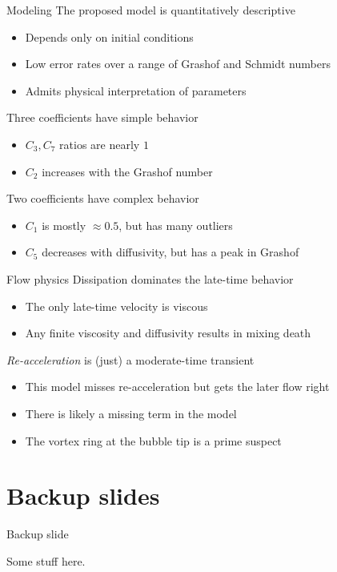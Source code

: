 \documentclass[12pt]{beamer}
\begin{document}
\begin{frame}{Modeling}
The proposed model is quantitatively descriptive
\begin{itemize}
  \item Depends only on initial conditions
  \item Low error rates over a range of Grashof and Schmidt numbers
  \item Admits physical interpretation of parameters
\end{itemize}

Three coefficients have simple behavior
\begin{itemize}
  \item $C_3, C_7$ ratios are nearly $1$
  \item $C_2$ increases with the Grashof number
\end{itemize}

Two coefficients have complex behavior
\begin{itemize}
  \item $C_1$ is mostly $\approx 0.5$, but has many outliers
  \item $C_5$ decreases with diffusivity, but has a peak in Grashof
\end{itemize}
\end{frame}

\begin{frame}{Flow physics}
Dissipation dominates the late-time behavior
\begin{itemize}
  \item The only late-time velocity is viscous
  \item Any finite viscosity and diffusivity results in mixing death
\end{itemize}

\textit{Re-acceleration} is (just) a moderate-time transient
\begin{itemize}
  \item This model misses re-acceleration but gets the later flow right
  \item There is likely a missing term in the model
  \item The vortex ring at the bubble tip is a prime suspect
\end{itemize}
\end{frame}

\appendix
\section*{Backup slides}
\begin{frame}{Backup slide}

	Some stuff here.

\end{frame}

\end{document}
